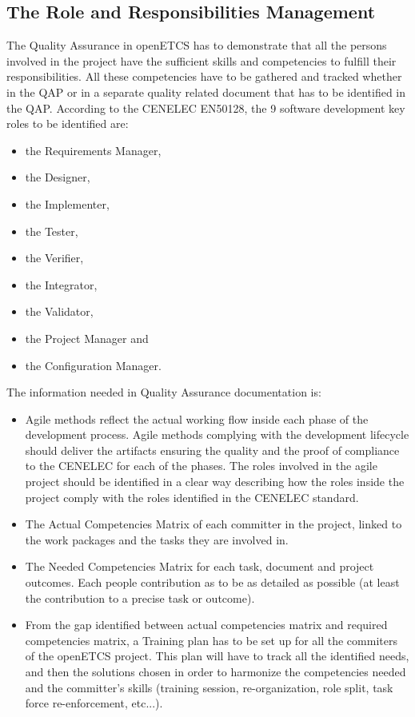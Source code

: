 \documentclass[openetcs]{template/openetcs_article}
\begin{document}
\subsection{The Role and Responsibilities Management}
The Quality Assurance in openETCS has to demonstrate that all the persons involved in the project have the sufficient skills and competencies to fulfill their
responsibilities. All these competencies have to be gathered and tracked whether in the QAP or in a separate quality related document that has to be identified
in the QAP.
According to the CENELEC EN50128, the 9 software development key roles to be identified are:
\begin{itemize}
\item the Requirements Manager,
\item the Designer,
\item the Implementer,
\item the Tester,
\item the Verifier,
\item the Integrator,
\item the Validator,
\item the Project Manager and
\item the Configuration Manager.
\end{itemize}

The information needed in Quality Assurance documentation is:
\begin{itemize}
\item Agile methods reflect the actual working flow inside each phase of the development process. Agile methods complying with the development lifecycle should deliver the artifacts ensuring the quality and the proof of compliance to the CENELEC for each of the phases. The roles involved in the agile project should be identified in a clear way describing how the roles inside the project comply with the roles identified in the CENELEC standard.
\item The Actual Competencies Matrix of each committer in the project, linked to the work packages and the tasks they are involved in.
\item The Needed Competencies Matrix for each task, document and project outcomes. Each people contribution as to be as detailed as possible (at least the
contribution to a precise task or outcome).
\item From the gap identified between actual competencies matrix and required competencies matrix, a Training plan has to be set up for all the commiters of the
openETCS project. This plan will have to track all the identified needs, and then the solutions chosen in order to harmonize the competencies needed and the
committer's skills (training session, re-organization, role split, task force re-enforcement, etc...).
\end{itemize}
\end{document}
